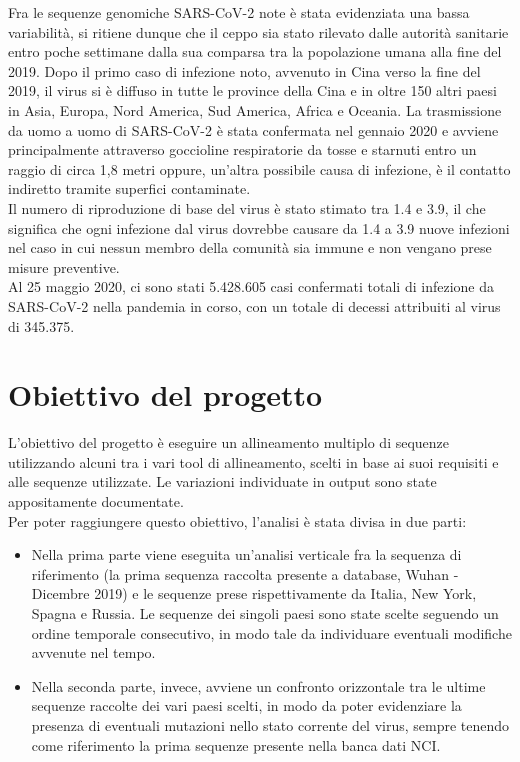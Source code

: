 \documentclass[a4paper,10pt]{article}
\begin{document}
Fra le sequenze genomiche SARS-CoV-2 note è stata evidenziata una bassa variabilità, si ritiene dunque che il ceppo sia stato rilevato dalle autorità sanitarie entro poche settimane dalla sua comparsa tra la popolazione umana alla fine del 2019.
Dopo il primo caso di infezione noto, avvenuto in Cina verso la fine del 2019, il virus si è diffuso in tutte le province della Cina e in oltre 150 altri paesi in Asia, Europa, Nord America, Sud America, Africa e Oceania.
La trasmissione da uomo a uomo di SARS-CoV-2 è stata confermata nel gennaio 2020 e avviene principalmente attraverso goccioline respiratorie da tosse e starnuti entro un raggio di circa 1,8 metri oppure, un'altra possibile causa di infezione, è il contatto indiretto tramite superfici contaminate.\\
Il numero di riproduzione di base del virus è stato stimato tra 1.4 e 3.9, il che significa che ogni infezione dal virus dovrebbe causare da 1.4 a 3.9 nuove infezioni nel caso in cui nessun membro della comunità sia immune e non vengano prese misure preventive.\\
Al 25 maggio 2020, ci sono stati 5.428.605 casi confermati totali di infezione da SARS-CoV-2 nella pandemia in corso, con un totale di decessi attribuiti al virus di 345.375. 

\newpage

\section{Obiettivo del progetto}
L'obiettivo del progetto è eseguire un allineamento multiplo di sequenze utilizzando alcuni tra i vari tool di allineamento, scelti in base ai suoi requisiti e alle sequenze utilizzate. Le variazioni individuate in output sono state appositamente documentate. \\
Per poter raggiungere questo obiettivo, l'analisi è stata divisa in due parti:
\begin{itemize}
\item Nella prima parte viene eseguita un'analisi verticale fra la sequenza di riferimento (la prima sequenza raccolta presente a database, Wuhan - Dicembre 2019) e le sequenze prese rispettivamente da Italia, New York, Spagna e Russia. Le sequenze dei singoli paesi sono state scelte seguendo un ordine temporale consecutivo, in modo tale da individuare eventuali modifiche avvenute nel tempo.
\item Nella seconda parte, invece, avviene un confronto orizzontale tra le ultime sequenze raccolte dei vari paesi scelti, in modo da poter evidenziare la presenza di eventuali mutazioni nello stato corrente del virus, sempre tenendo come riferimento la prima sequenze presente nella banca dati NCI. 
\end{itemize}
\end{document}
